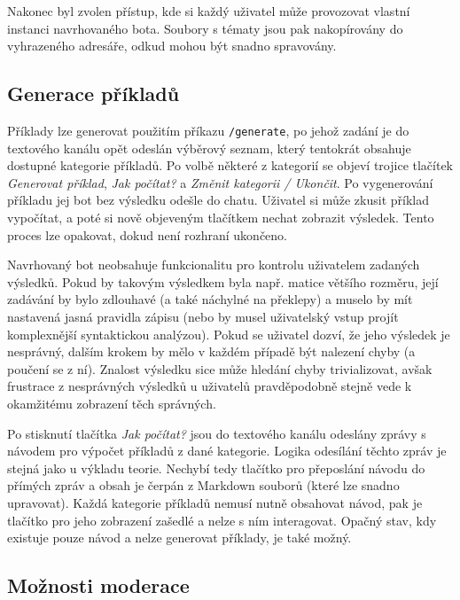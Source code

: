 \documentclass[FM]{tulthesis}
\begin{document}
	Nakonec byl zvolen přístup, kde si každý uživatel může provozovat vlastní instanci navrhovaného bota. Soubory s tématy jsou pak nakopírovány do vyhrazeného adresáře, odkud mohou být snadno spravovány. %
	
	\subsection{Generace příkladů} %
	
	Příklady lze generovat použitím příkazu \verb*|/generate|, po jehož zadání je do textového kanálu opět odeslán výběrový seznam, který tentokrát obsahuje dostupné kategorie příkladů. Po volbě některé z kategorií se objeví trojice tlačítek \textit{Generovat příklad}, \textit{Jak počítat?} a \textit{Změnit kategorii / Ukončit}. Po vygenerování příkladu jej bot bez výsledku odešle do chatu. Uživatel si může zkusit příklad vypočítat, a poté si nově objeveným tlačítkem nechat zobrazit výsledek. Tento proces lze opakovat, dokud není rozhraní ukončeno.
	
	Navrhovaný bot neobsahuje funkcionalitu pro kontrolu uživatelem zadaných výsledků. Pokud by takovým výsledkem byla např. matice většího rozměru, její zadávání by bylo zdlouhavé (a také náchylné na překlepy) a muselo by mít nastavená jasná pravidla zápisu (nebo by musel uživatelský vstup projít komplexnější syntaktickou analýzou). Pokud se uživatel dozví, že jeho výsledek je nesprávný, dalším krokem by mělo v každém případě být nalezení chyby (a poučení se z ní). Znalost výsledku sice může hledání chyby trivializovat, avšak frustrace z nesprávných výsledků u uživatelů pravděpodobně stejně vede k okamžitému zobrazení těch správných.
	
	Po stisknutí tlačítka \textit{Jak počítat?} jsou do textového kanálu odeslány zprávy s návodem pro výpočet příkladů z dané kategorie. Logika odesílání těchto zpráv je stejná jako u výkladu teorie. Nechybí tedy tlačítko pro přeposlání návodu do přímých zpráv a obsah je čerpán z Markdown souborů (které lze snadno upravovat). Každá kategorie příkladů nemusí nutně obsahovat návod, pak je tlačítko pro jeho zobrazení zašedlé a nelze s ním interagovat. Opačný stav, kdy existuje pouze návod a nelze generovat příklady, je také možný. %
		
	\subsection{Možnosti moderace}
	
\end{document}
